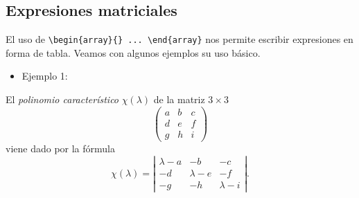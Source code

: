 \documentclass[12pt,a4paper,]{book}
\providecommand{\tightlist}{%
  \setlength{\itemsep}{0pt}\setlength{\parskip}{0pt}}
\numberwithin{dummy}{section}
\theoremstyle{ocrenumbox}
\theoremstyle{blacknumex}
\theoremstyle{blacknumbox}
\theoremstyle{ocrenum}
\theoremstyle{ocrenum}
\begin{document}
\hypertarget{expresiones-matriciales}{%
\subsection{Expresiones matriciales}\label{expresiones-matriciales}}

El uso de
\texttt{\textbackslash{}begin\{array\}\{\}\ ...\ \textbackslash{}end\{array\}}
nos permite escribir expresiones en forma de tabla. Veamos con algunos
ejemplos su uso básico.

\begin{itemize}
\tightlist
\item
  Ejemplo 1:
\end{itemize}

El \emph{polinomio característico} \(\chi(\lambda)\) de la matriz
\(3 \times 3\) \[ \left( \begin{array}{ccc}
a & b & c \\
d & e & f \\
g & h & i \end{array} \right)\] viene dado por la fórmula \[ 
\chi(\lambda) = 
\left| 
\begin{array}{ccc}
\lambda - a & -b & -c \\
-d & \lambda - e & -f \\
-g & -h & \lambda - i 
\end{array} 
\right|.
\]
\end{document}
